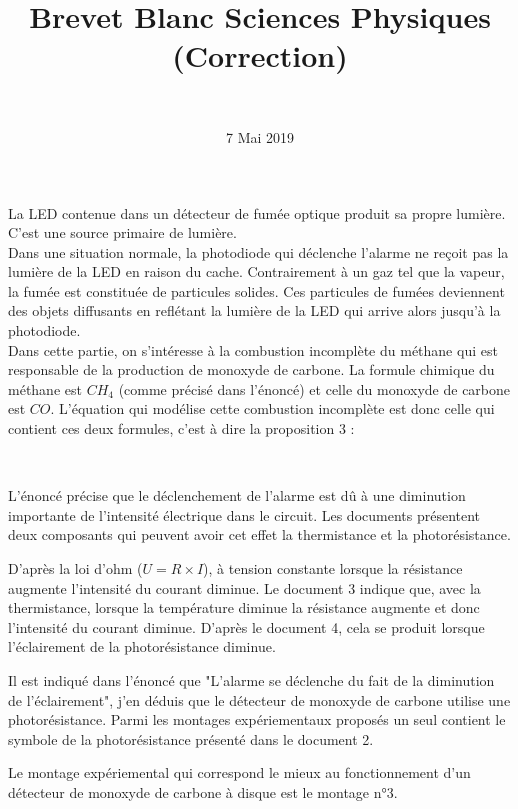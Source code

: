 \documentclass[a4paper,12pt]{exam}
\author{\ }
\date{7 Mai 2019}
\title{Brevet Blanc Sciences Physiques (Correction)}
\begin{document}
%	

\maketitle
	

\begin{questions}
	\question[3] La LED contenue dans un détecteur de fumée optique produit sa propre lumière. C'est une source primaire de lumière.\\
	
	
	\question[4] Dans une situation normale, la photodiode qui déclenche l'alarme ne reçoit pas la lumière de la LED en raison du cache. Contrairement à un gaz tel que la vapeur, la fumée est constituée de particules solides. Ces particules de fumées deviennent des objets diffusants en reflétant la lumière de la LED qui arrive alors jusqu'à la photodiode. \\
	
	
	\question[6] Dans cette partie, on s'intéresse à la combustion incomplète du méthane qui est responsable de la production de monoxyde de carbone. La formule chimique du méthane est $CH_4$ (comme précisé dans l'énoncé) et celle du monoxyde de carbone est $CO$. L'équation qui modélise cette combustion incomplète est donc celle qui contient ces deux formules, c'est à dire la proposition 3 :
	
	\begin{center}
		\\
	\end{center}

	\question[9] L'énoncé précise que le déclenchement de l'alarme est dû à une diminution importante de l'intensité électrique dans le circuit. Les documents présentent deux composants qui peuvent avoir cet effet la thermistance et la photorésistance. 
	
	D'après la loi d'ohm ($U = R \times I$), à tension constante lorsque la résistance augmente l'intensité du courant diminue. Le document 3 indique que, avec la thermistance, lorsque la température diminue la résistance augmente et donc l'intensité du courant diminue. D'après le document 4, cela se produit lorsque l'éclairement de la photorésistance diminue.
	
	Il est indiqué dans l'énoncé que "L'alarme se déclenche du fait de la diminution de l'éclairement", j'en déduis que le détecteur de monoxyde de carbone utilise une photorésistance. Parmi les montages expériementaux proposés un seul contient le symbole de la photorésistance présenté dans le document 2.
	
	Le montage expériemental qui correspond le mieux au fonctionnement d'un détecteur de monoxyde de carbone à disque est le montage n°3.


			
\end{questions}

%
%
%

%






 
%
\ \label{LastPage}
\end{document}
